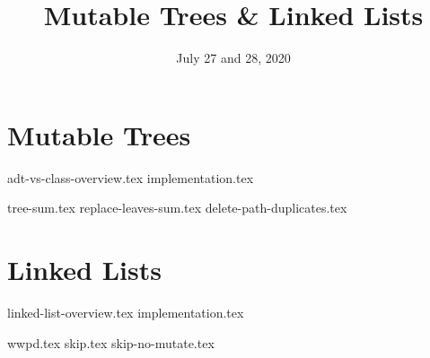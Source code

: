 \documentclass{exam}
\title{Mutable Trees \& Linked Lists}
\date{July 27 and 28, 2020}
\begin{document}
\maketitle


\section{Mutable Trees}
{adt-vs-class-overview.tex}
\newpage
{implementation.tex}
\begin{questions}

{tree-sum.tex}
\newpage
{replace-leaves-sum.tex}
{delete-path-duplicates.tex}
\end{questions}

\section{Linked Lists}
{linked-list-overview.tex}
{implementation.tex}
\begin{questions}
\newpage
{wwpd.tex}
\newpage
{skip.tex}
{skip-no-mutate.tex}
\newpage
\end{questions}
\end{document}
